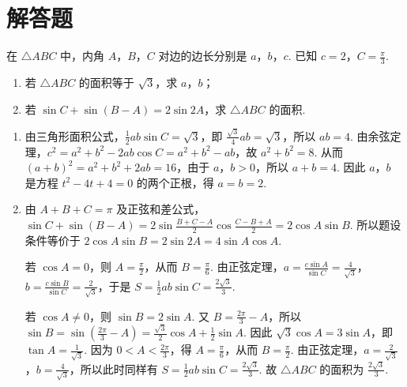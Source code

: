 \section{解答题}

\begin{problem}
在 \(\triangle ABC\) 中，内角 \(A\)，\(B\)，\(C\) 对边的边长分别是 \(a\)，\(b\)，\(c\). 已知 \(c = 2\)，\(C = \frac{\pi}{3}\).

\begin{enumerate}
\item 若 \(\triangle ABC\) 的面积等于 \(\sqrt{3}\)，求 \(a\)，\(b\)；
\item 若 \(\sin C + \sin (B - A) = 2\sin 2A\)，求 \(\triangle ABC\) 的面积.
\end{enumerate}
\end{problem}

\begin{solution}
\begin{enumerate}
\item 由三角形面积公式，\(\frac{1}{2}ab\sin C=\sqrt{3}\)，即 \(\frac{\sqrt{3}}{4}ab=\sqrt{3}\)，所以 \(ab=4\). 由余弦定理，\(c^{2}=a^{2}+b^{2}-2ab\cos C=a^{2}+b^{2}-ab\)，故 \(a^{2}+b^{2}=8\). 从而 \((a+b)^{2}=a^{2}+b^{2}+2ab=16\)，由于 \(a\)，\(b>0\)，所以 \(a+b=4\). 因此 \(a\)，\(b\) 是方程 \(t^{2}-4t+4=0\) 的两个正根，得 \(a=b=2\).

\item 由 \(A+B+C=\pi\) 及正弦和差公式，\(\sin C+\sin(B-A)=2\sin\frac{B+C-A}{2}\cos\frac{C-B+A}{2}=2\cos A\sin B\). 所以题设条件等价于 \(2\cos A\sin B=2\sin 2A=4\sin A\cos A\).

若 \(\cos A=0\)，则 \(A=\frac{\pi}{2}\)，从而 \(B=\frac{\pi}{6}\). 由正弦定理，\(a=\frac{c\sin A}{\sin C}=\frac{4}{\sqrt{3}}\)，\(b=\frac{c\sin B}{\sin C}=\frac{2}{\sqrt{3}}\)，于是 \(S=\frac{1}{2}ab\sin C=\frac{2\sqrt{3}}{3}\).

若 \(\cos A\ne0\)，则 \(\sin B=2\sin A\). 又 \(B=\frac{2\pi}{3}-A\)，所以 \(\sin B=\sin\left(\frac{2\pi}{3}-A\right)=\frac{\sqrt{3}}{2}\cos A+\frac{1}{2}\sin A\). 因此 \(\sqrt{3}\cos A=3\sin A\)，即 \(\tan A=\frac{1}{\sqrt{3}}\). 因为 \(0<A<\frac{2\pi}{3}\)，得 \(A=\frac{\pi}{6}\)，从而 \(B=\frac{\pi}{2}\). 由正弦定理，\(a=\frac{2}{\sqrt{3}}\)，\(b=\frac{4}{\sqrt{3}}\)，所以此时同样有 \(S=\frac{1}{2}ab\sin C=\frac{2\sqrt{3}}{3}\). 故 \(\triangle ABC\) 的面积为 \(\frac{2\sqrt{3}}{3}\).
\end{enumerate}
\end{solution}

